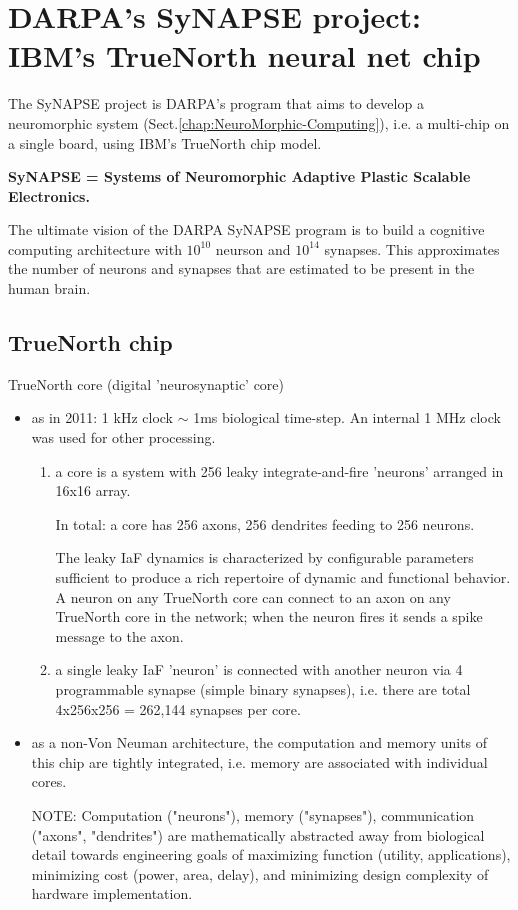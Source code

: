 \chapter{DARPA's SyNAPSE project: IBM's TrueNorth neural net chip}
\label{chap:SYNAPSE}

The SyNAPSE project is DARPA's program that aims to develop a
neuromorphic system (Sect.\ref{chap:NeuroMorphic-Computing}), i.e. a multi-chip
on a single board, using IBM's TrueNorth chip model.

{\bf SyNAPSE = Systems of Neuromorphic Adaptive Plastic Scalable Electronics.}

The ultimate vision of the DARPA SyNAPSE program is to build a cognitive
computing architecture with $10^{10}$ neurson and $10^{14}$ synapses. This
approximates the number of neurons and synapses that are estimated to be present
in the human brain.

\section{TrueNorth chip}
\label{sec:TrueNorth-chip}

TrueNorth core (digital 'neurosynaptic' core)
\begin{itemize}
  \item as in 2011: 1 kHz clock $\sim$ 1ms biological time-step. An internal 1
  MHz clock was used for other processing.

\begin{enumerate}
  \item a core is a system with 256 leaky integrate-and-fire 'neurons'
  arranged in 16x16 array.
  
In total: a core has 256 axons, 256 dendrites feeding to 256 neurons.

The leaky IaF dynamics is characterized  by  configurable parameters sufficient
to produce a rich repertoire of dynamic and functional behavior.
A neuron on any TrueNorth core can connect  to  an  axon  on  any  TrueNorth 
core  in  the  network; when the neuron fires it sends a spike message to the
axon.
    
  \item a single leaky IaF 'neuron' is connected with another neuron via 4
  programmable synapse (simple binary synapses), i.e. there are total 4x256x256
  = 262,144 synapses per core.
\end{enumerate}

  \item as a non-Von Neuman architecture, the computation and memory units of
  this chip are tightly integrated, i.e. memory are associated with individual
  cores.
  
NOTE: Computation ("neurons"), memory ("synapses"), communication ("axons",
"dendrites") are mathematically abstracted away from biological detail towards
engineering goals of maximizing function (utility, applications), minimizing
cost (power, area, delay), and minimizing design complexity of hardware
implementation.
  

\end{itemize}

